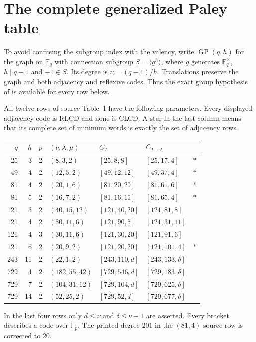 \section{The complete generalized Paley table}
To avoid confusing the subgroup index with the valency, write
$\operatorname{GP}(q,h)$ for the graph on $\mathbb F_q$ with connection
subgroup $S=\langle g^h\rangle$, where $g$ generates
$\mathbb F_q^\times$, $h\mid q-1$ and $-1\in S$.
Its degree is $\nu=(q-1)/h$. Translations preserve the graph and both
adjacency and reflexive codes. Thus the exact group hypothesis of
 is available for every row below.

\begin{theorem}\label{thm:paley-table}
All twelve rows of source Table~1 have the following parameters.
Every displayed adjacency code is RLCD and none is CLCD.
A star in the last column means that its complete set of minimum words
is exactly the set of adjacency rows.
\begin{center}\small
\begin{tabular}{rrrlll c}\toprule
$q$&$h$&$p$&$(\nu,\lambda,\mu)$&$C_A$&$C_{I+A}$&\\\midrule
25&3&2&$(8,3,2)$&$[25,8,8]$&$[25,17,4]$&$*$\\
49&4&2&$(12,5,2)$&$[49,12,12]$&$[49,37,4]$&$*$\\
81&4&2&$(20,1,6)$&$[81,20,20]$&$[81,61,6]$&$*$\\
81&5&2&$(16,7,2)$&$[81,16,16]$&$[81,65,4]$&$*$\\
121&3&2&$(40,15,12)$&$[121,40,20]$&$[121,81,8]$&\\
121&4&2&$(30,11,6)$&$[121,90,6]$&$[121,31,11]$&\\
121&4&3&$(30,11,6)$&$[121,30,20]$&$[121,91,6]$&\\
121&6&2&$(20,9,2)$&$[121,20,20]$&$[121,101,4]$&$*$\\
243&11&2&$(22,1,2)$&$[243,110,d]$&$[243,133,\delta]$&\\
729&4&2&$(182,55,42)$&$[729,546,d]$&$[729,183,\delta]$&\\
729&7&2&$(104,31,12)$&$[729,104,d]$&$[729,625,\delta]$&\\
729&14&2&$(52,25,2)$&$[729,52,d]$&$[729,677,\delta]$&\\\bottomrule
\end{tabular}
\end{center}
In the last four rows only $d\leq\nu$ and $\delta\leq\nu+1$ are
asserted. Every bracket describes a code over $\mathbb F_p$.
The printed degree $201$ in the $(81,4)$ source row is corrected to $20$.
\end{theorem}
